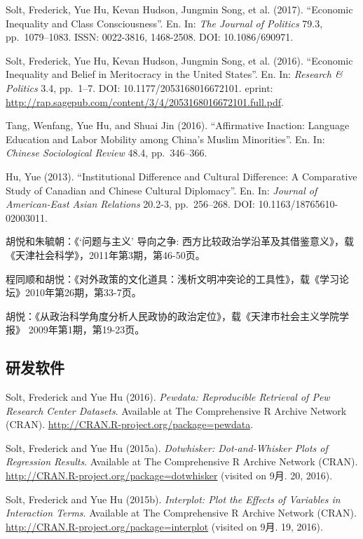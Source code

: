 \documentclass[10.5pt,]{article}
\begin{document}
Solt, Frederick, Yue Hu, Kevan Hudson, Jungmin Song, et al. (2017).
``Economic Inequality and Class Consciousness''. En. In:
\emph{The Journal of Politics} 79.3, pp.~1079--1083. ISSN: 0022-3816,
1468-2508. DOI: 10.1086/690971.

Solt, Frederick, Yue Hu, Kevan Hudson, Jungmin Song, et al. (2016).
``Economic Inequality and Belief in Meritocracy in the United States''.
En. In: \emph{Research \& Politics} 3.4, pp.~1--7. DOI:
10.1177/2053168016672101. eprint:
\url{http://rap.sagepub.com/content/3/4/2053168016672101.full.pdf}.

Tang, Wenfang, Yue Hu, and Shuai Jin (2016). ``Affirmative Inaction:
Language Education and Labor Mobility among China's Muslim Minorities''.
En. In: \emph{Chinese Sociological Review} 48.4, pp.~346--366.

Hu, Yue (2013). ``Institutional Difference and Cultural Difference: A
Comparative Study of Canadian and Chinese Cultural Diplomacy''. En. In:
\emph{Journal of American-East Asian Relations} 20.2-3, pp.~256--268.
DOI: 10.1163/18765610-02003011.

胡悦和朱毓朝：《`问题与主义' 导向之争:
西方比较政治学沿革及其借鉴意义》，载《天津社会科学》，2011年第3期，第46-50页。

程同顺和胡悦：《对外政策的文化道具：浅析文明冲突论的工具性》，载《学习论坛》2010年第26期，第33-7页。

胡悦：《从政治科学角度分析人民政协的政治定位》，载《天津市社会主义学院学报》
2009年第1期，第19-23页。

\hypertarget{ux7814ux53d1ux8f6fux4ef6}{%
\subsection{研发软件}\label{ux7814ux53d1ux8f6fux4ef6}}

Solt, Frederick and Yue Hu (2016).
\emph{Pewdata: Reproducible Retrieval of Pew Research Center Datasets}.
Available at The Comprehensive R Archive Network (CRAN).
\url{http://CRAN.R-project.org/package=pewdata}.

Solt, Frederick and Yue Hu (2015a).
\emph{Dotwhisker: Dot-and-Whisker Plots of Regression Results}.
Available at The Comprehensive R Archive Network (CRAN).
\url{http://CRAN.R-project.org/package=dotwhisker} (visited on 9月. 20,
2016).

Solt, Frederick and Yue Hu (2015b).
\emph{Interplot: Plot the Effects of Variables in Interaction Terms}.
Available at The Comprehensive R Archive Network (CRAN).
\url{http://CRAN.R-project.org/package=interplot} (visited on 9月. 19,
2016).
\end{document}
